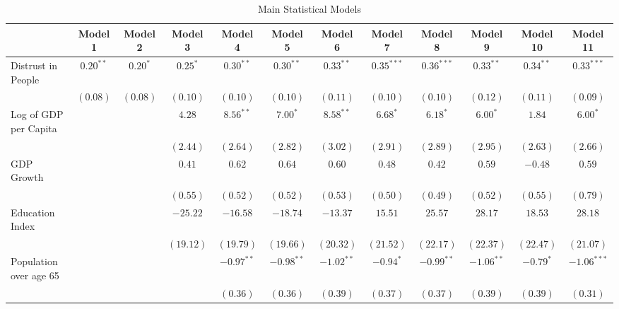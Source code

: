 \documentclass[
  11pt,
]{article}
\begin{document}
\begin{table}
\caption{Main Statistical Models}
\begin{center}
\begin{small}
\begin{tabular}{l c c c c c c c c c c c}
\hline
 & Model 1 & Model 2 & Model 3 & Model 4 & Model 5 & Model 6 & Model 7 & Model 8 & Model 9 & Model 10 & Model 11 \\
\hline
Distrust in People           & $0.20^{**}$ & $0.20^{*}$ & $0.25^{*}$ & $0.30^{**}$  & $0.30^{**}$  & $0.33^{**}$  & $0.35^{***}$ & $0.36^{***}$ & $0.33^{**}$  & $0.34^{**}$ & $0.33^{***}$  \\
                             & $(0.08)$    & $(0.08)$   & $(0.10)$   & $(0.10)$     & $(0.10)$     & $(0.11)$     & $(0.10)$     & $(0.10)$     & $(0.12)$     & $(0.11)$    & $(0.09)$      \\
Log of GDP per Capita        &             &            & $4.28$     & $8.56^{**}$  & $7.00^{*}$   & $8.58^{**}$  & $6.68^{*}$   & $6.18^{*}$   & $6.00^{*}$   & $1.84$      & $6.00^{*}$    \\
                             &             &            & $(2.44)$   & $(2.64)$     & $(2.82)$     & $(3.02)$     & $(2.91)$     & $(2.89)$     & $(2.95)$     & $(2.63)$    & $(2.66)$      \\
GDP Growth                   &             &            & $0.41$     & $0.62$       & $0.64$       & $0.60$       & $0.48$       & $0.42$       & $0.59$       & $-0.48$     & $0.59$        \\
                             &             &            & $(0.55)$   & $(0.52)$     & $(0.52)$     & $(0.53)$     & $(0.50)$     & $(0.49)$     & $(0.52)$     & $(0.55)$    & $(0.79)$      \\
Education Index              &             &            & $-25.22$   & $-16.58$     & $-18.74$     & $-13.37$     & $15.51$      & $25.57$      & $28.17$      & $18.53$     & $28.18$       \\
                             &             &            & $(19.12)$  & $(19.79)$    & $(19.66)$    & $(20.32)$    & $(21.52)$    & $(22.17)$    & $(22.37)$    & $(22.47)$   & $(21.07)$     \\
Population over age 65       &             &            &            & $-0.97^{**}$ & $-0.98^{**}$ & $-1.02^{**}$ & $-0.94^{*}$  & $-0.99^{**}$ & $-1.06^{**}$ & $-0.79^{*}$ & $-1.06^{***}$ \\
                             &             &            &            & $(0.36)$     & $(0.36)$     & $(0.39)$     & $(0.37)$     & $(0.37)$     & $(0.39)$     & $(0.39)$    & $(0.31)$      \\

\end{tabular}
\end{small}
\end{center}
\end{table}
\end{document}
